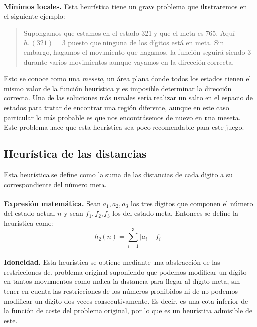 \documentclass[12pt]{article}
\begin{document}
\paragraph{}
\textbf{Mínimos locales.} Esta heurística tiene un grave problema que ilustraremos en el siguiente ejemplo:
\begin{quote}
Supongamos que estamos en el estado 321 y que el meta es 765. Aquí $h_1(321)=3$ puesto que ninguna de los dígitos está en meta. Sin embargo, hagamos el movimiento que hagamos, la función seguirá siendo 3 durante varios movimientos aunque vayamos en la dirección correcta.
\end{quote}
Esto se conoce como una \textit{meseta}, un área plana donde todos los estados tienen el mismo valor de la función heurística y es imposible determinar la dirección correcta. Una de las soluciones más usuales sería realizar un salto en el espacio de estados para tratar de encontrar una región diferente, aunque en este caso particular lo más probable es que nos encontrásemos de nuevo en una meseta. Este problema hace que esta heurística sea poco recomendable para este juego.
\subsection{Heurística de las distancias}
Esta heurística se define como la suma de las distancias de cada dígito a su correspondiente del número meta.
\paragraph{}
\textbf{Expresión matemática.}  Sean $a_1,a_2,a_3$ los tres dígitos que componen el número del estado actual $n$ y sean $f_1,f_2,f_3$ los del estado meta. Entonces se define la heurística como:
\begin{equation}
h_2(n)=\sum_{i=1}^3|a_i-f_i|
\end{equation}
\paragraph{}
\textbf{Idoneidad.} Esta heurística se obtiene mediante una abstracción de las restricciones del problema original suponiendo que podemos modificar un dígito en tantos movimientos como indica la distancia para llegar al dígito meta, sin tener en cuenta las restricciones de los números prohibidos ni de no podemos modificar un dígito dos veces consecutivamente. Es decir, es una cota inferior de la función de coste del problema original, por lo que es un heurística admisible de este.
\end{document}
